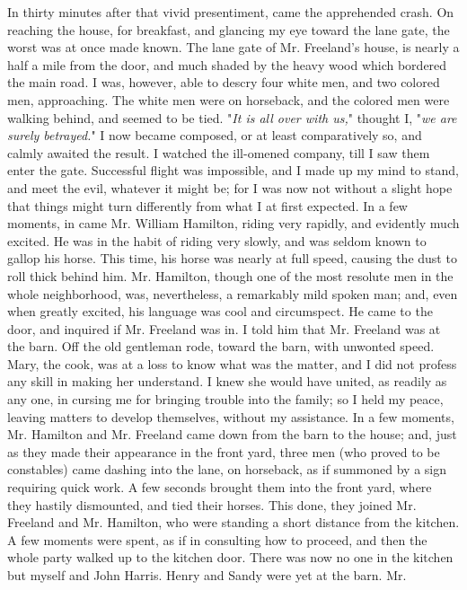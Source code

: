 In thirty minutes after that vivid presentiment, came the apprehended
crash. On reaching the house, for breakfast, and glancing my eye toward
the lane gate, the worst was at once made known. The lane gate of Mr.
Freeland's house, is nearly a half a mile from the door, and much shaded
by the heavy wood which bordered the main road. I was, however, able to
descry four white men, and two colored men, approaching. The white men
were on horseback, and the colored men were walking behind, and seemed
to be tied. "\emph{It is all over with us,}" thought I, "\emph{we are
surely betrayed.}" I now became composed, or at least comparatively so,
and calmly awaited the result. I watched the ill-omened company, till I
saw them enter the gate. Successful flight was impossible, and I made up
my mind to stand, and meet the evil, whatever it might be; for I was now
not without a slight hope that things might turn differently from what I
at first expected. In a few moments, in {}came Mr. William Hamilton,
riding very rapidly, and evidently much excited. He was in the habit of
riding very slowly, and was seldom known to gallop his horse. This time,
his horse was nearly at full speed, causing the dust to roll thick
behind him. Mr. Hamilton, though one of the most resolute men in the
whole neighborhood, was, nevertheless, a remarkably mild spoken man;
and, even when greatly excited, his language was cool and circumspect.
He came to the door, and inquired if Mr. Freeland was in. I told him
that Mr. Freeland was at the barn. Off the old gentleman rode, toward
the barn, with unwonted speed. Mary, the cook, was at a loss to know
what was the matter, and I did not profess any skill in making her
understand. I knew she would have united, as readily as any one, in
cursing me for bringing trouble into the family; so I held my peace,
leaving matters to develop themselves, without my assistance. In a few
moments, Mr. Hamilton and Mr. Freeland came down from the barn to the
house; and, just as they made their appearance in the front yard, three
men (who proved to be constables) came dashing into the lane, on
horseback, as if summoned by a sign requiring quick work. A few seconds
brought them into the front yard, where they hastily dismounted, and
tied their horses. This done, they joined Mr. Freeland and Mr. Hamilton,
who were standing a short distance from the kitchen. A few moments were
spent, as if in consulting how to proceed, and then the whole party
walked up to the kitchen door. There was now no one in the kitchen but
myself and John Harris. Henry and Sandy were yet at the barn. {}Mr.
